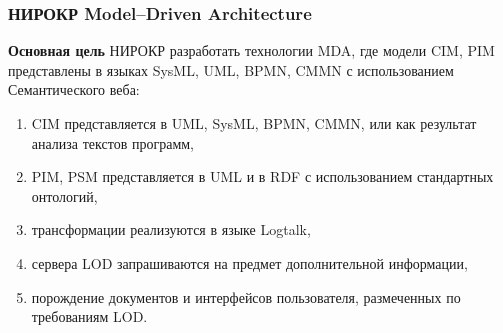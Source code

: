 \documentclass[10pt]{beamer}
\begin{document}
\begin{frame}
  \frametitle{НИРОКР Model--Driven Architecture}
  \textbf{Основная цель} НИРОКР разработать технологии MDA, где модели CIM, PIM представлены в языках SysML, UML, BPMN, CMMN с использованием Семантического веба:
  \begin{enumerate}
  \item CIM представляется в UML, SysML, BPMN, CMMN, или как результат анализа текстов программ,
  \item PIM, PSM представляется в UML и в RDF с использованием стандартных онтологий,
  \item трансформации реализуются в языке Logtalk,
  \item сервера LOD запрашиваются на предмет дополнительной информации,
  \item порождение документов и интерфейсов пользователя, размеченных по требованиям LOD.
  \end{enumerate}
\end{frame}


\end{document}
